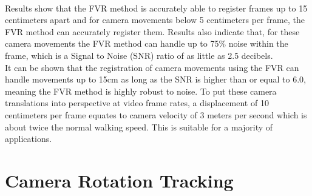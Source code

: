 \begin{table}[!htb]
\centering
{}
\\
\caption{Translation Tracking}
\label{table:trans}
\end{table}

Results show that the FVR method is accurately able to register frames up to 15 centimeters apart and for camera movements below 5 centimeters per frame, the FVR method can accurately register them. Results also indicate that, for these camera movements the FVR method can handle up to 75\% noise within the frame, which is a Signal to Noise (SNR) ratio of as little as 2.5 decibels. \\

It can be shown that the registration of camera movements using the FVR can handle movements up to 15cm as long as the SNR is higher than or equal to 6.0, meaning the FVR method is highly robust to noise. To put these camera translations into perspective at video frame rates, a displacement of 10 centimeters per frame equates to camera velocity of 3 meters per second which is about twice the normal walking speed. This is suitable for a majority of applications. \\


\section{Camera Rotation Tracking}
\label{Sec:CamRoteTrackExp}

